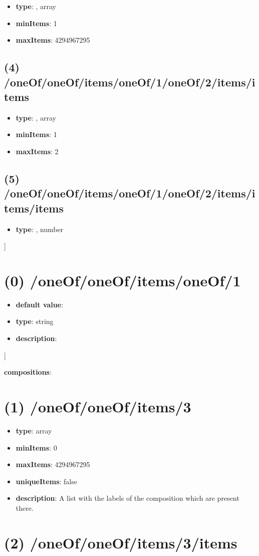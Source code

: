 \begin{itemize}[leftmargin=3em]\item {\bf type}: , array\item {\bf minItems}: 1
\item {\bf maxItems}: 4294967295
\end{itemize}\subsection{(4) /oneOf/oneOf/items/oneOf/1/oneOf/2/items/items}
\begin{itemize}[leftmargin=4em]\item {\bf type}: , array\item {\bf minItems}: 1
\item {\bf maxItems}: 2
\end{itemize}\subsection{(5) /oneOf/oneOf/items/oneOf/1/oneOf/2/items/items/items}
\begin{itemize}[leftmargin=5em]\item {\bf type}: , number\end{itemize}]\section{(0) /oneOf/oneOf/items/oneOf/1}
\begin{itemize}[leftmargin=0em]\item {\bf default value}: 
\item {\bf type}: string
\item {\bf description}: 
\end{itemize}]\item {\bf compositions}: \section{(1) /oneOf/oneOf/items/3}
\begin{itemize}[leftmargin=1em]\item {\bf type}: array
\item {\bf minItems}: 0
\item {\bf maxItems}: 4294967295
\item {\bf uniqueItems}: false
\item {\bf description}: A list with the labels of the composition which are present there.
\end{itemize}\section{(2) /oneOf/oneOf/items/3/items}
